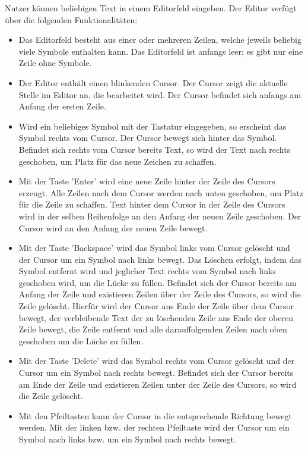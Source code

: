 \documentclass[parskip=full,11pt,twoside]{scrartcl}
\begin{document}
Nutzer können beliebigen Text in einem Editorfeld eingeben. 
Der Editor verfügt über die folgenden Funktionalitäten:
\begin{itemize}
	\item Das Editorfeld besteht aus einer oder mehreren Zeilen, welche jeweils beliebig viele Symbole enthalten kann. Das Editorfeld ist anfangs leer; es gibt nur eine Zeile ohne Symbole.
	\item Der Editor enthält einen blinkenden Cursor. Der Cursor zeigt die aktuelle Stelle im Editor an, die bearbeitet wird. Der Cursor befindet sich anfangs am Anfang der ersten Zeile.
	\item Wird ein beliebiges Symbol mit der Tastatur eingegeben, so erscheint das Symbol rechts vom Cursor. Der Cursor bewegt sich hinter das Symbol. Befindet sich rechts vom Cursor bereits Text, so wird der Text nach rechts geschoben, um Platz für das neue Zeichen zu schaffen. 
	\item Mit der Taste 'Enter' wird eine neue Zeile hinter der Zeile des Cursors erzeugt. 
	Alle Zeilen nach dem Cursor werden nach unten geschoben, um Platz für die Zeile zu schaffen. 
	Text hinter dem Cursor in der Zeile des Cursors wird in der selben Reihenfolge an den Anfang der neuen Zeile geschoben.
	Der Cursor wird an den Anfang der neuen Zeile bewegt.
	\item Mit der Taste 'Backspace' wird das Symbol links vom Cursor gelöscht und der Cursor um ein Symbol nach links bewegt. 
	Das Löschen erfolgt, indem das Symbol entfernt wird und jeglicher Text rechts vom Symbol nach links geschoben wird, um die Lücke zu füllen.
	Befindet sich der Cursor bereits am Anfang der Zeile und existieren Zeilen über der Zeile des Cursors, so wird die Zeile gelöscht. 
	Hierfür wird der Cursor ans Ende der Zeile über dem Cursor bewegt, der verbleibende Text der zu löschenden Zeile ans Ende der oberen Zeile bewegt, die Zeile entfernt und alle darauffolgenden Zeilen nach oben geschoben um die Lücke zu füllen.
	\item Mit der Taste 'Delete' wird das Symbol rechts vom Cursor gelöscht und der Cursor um ein Symbol nach rechts bewegt.
	Befindet sich der Cursor bereits am Ende der Zeile und existieren Zeilen unter der Zeile des Cursors, so wird die Zeile gelöscht. 
	\item Mit den Pfeiltasten kann der Cursor in die entsprechende Richtung bewegt werden. 
	Mit der linken bzw. der rechten Pfeiltaste wird der Cursor um ein Symbol nach links bzw. um ein Symbol nach rechts bewegt. 

\end{itemize}
\end{document}
